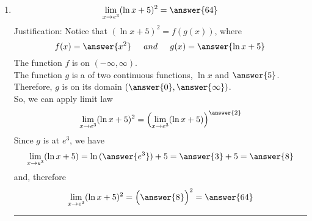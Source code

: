 \documentclass{ximera}
\begin{document}
\begin{exercise}
\begin{enumerate}
\noindent\rule[0.5ex]{\linewidth}{.2pt}
\item
 \[
\lim_{x\to e^{3}}(\ln{x}+5)^{2} = \answer{64}
\] 
Justification: Notice that $(\ln{x}+5)^{2} =f(g(x)) $, where
\[
 f(x)=\answer{x^{2}} \hspace{0.2in}and \hspace{0.2in} g(x)=\answer{\ln{x}+5}
\] 
The function $f$ is   on $ (-\infty,\infty)$.\\
The function $g$ is a   of two continuous functions, $\ln{x}$ and $ \answer{5}$.
Therefore, $g$ is   on its domain $(\answer{0},\answer{\infty})$.\\
So, we can apply
  limit law 
 \[
\lim_{x\to e^{3}}(\ln{x}+5)^{2} =\Bigl(\lim_{x\to e^{3}}(\ln{x}+5)\Bigr)^{\answer{2}} 
\] 
Since $g$ is   at $e^{3}$, we have
 \[
\lim_{x\to e^{3}}(\ln{x}+5)=\ln{(\answer{e^{3}})}+5=\answer{3}+5=\answer{8}
\] 
and, therefore
\[
\lim_{x\to e^{3}}(\ln{x}+5)^{2} = \Bigl(\answer{8}\Bigr)^{2} =\answer{64}
\] 
\noindent\rule[0.5ex]{\linewidth}{.2pt}
\end{enumerate}
\end{exercise}
\end{document}

